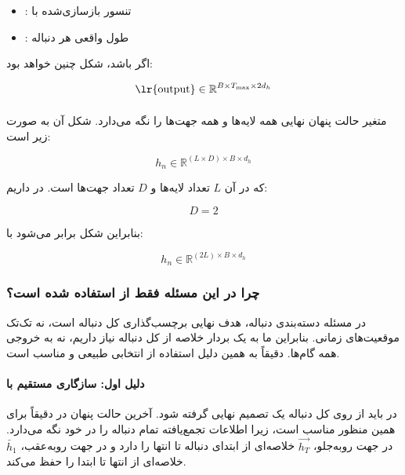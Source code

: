 \documentclass{article}
\begin{document}
\begin{itemize}
	\item {}: تنسور بازسازی‌شده با 
	\item {}: طول واقعی هر دنباله
\end{itemize}

اگر  باشد، شکل  چنین خواهد بود:

\begin{equation}
	\text{\lr{output}} \in \mathbb{R}^{B \times T_{\max} \times 2d_h}
\end{equation}

\paragraph{}
متغیر  حالت پنهان نهایی همه لایه‌ها و همه جهت‌ها را نگه می‌دارد. شکل آن به صورت زیر است:

\begin{equation}
	h_n \in \mathbb{R}^{(L \times D) \times B \times d_h}
\end{equation}

که در آن \(L\) تعداد لایه‌ها و \(D\) تعداد جهت‌ها است. در  داریم:

\begin{equation}
	D = 2
\end{equation}

بنابراین شکل  برابر می‌شود با:

\begin{equation}
	h_n \in \mathbb{R}^{(2L) \times B \times d_h}
\end{equation}

\subsubsection{چرا در این مسئله فقط از  استفاده شده است؟}

در مسئله دسته‌بندی دنباله، هدف نهایی برچسب‌گذاری کل دنباله است، نه تک‌تک موقعیت‌های زمانی. بنابراین ما به یک بردار خلاصه از کل دنباله نیاز داریم، نه به خروجی همه گام‌ها. دقیقاً به همین دلیل استفاده از  انتخابی طبیعی و مناسب است.

\paragraph{دلیل اول: سازگاری مستقیم با }
در  باید از روی کل دنباله یک تصمیم نهایی گرفته شود. آخرین حالت پنهان در  دقیقاً برای همین منظور مناسب است، زیرا اطلاعات تجمع‌یافته تمام دنباله را در خود نگه می‌دارد. در جهت رو‌به‌جلو، \(\overrightarrow{h_T}\) خلاصه‌ای از ابتدای دنباله تا انتها را دارد و در جهت رو‌به‌عقب، \(\overleftarrow{h_1}\) خلاصه‌ای از انتها تا ابتدا را حفظ می‌کند.
\end{document}
